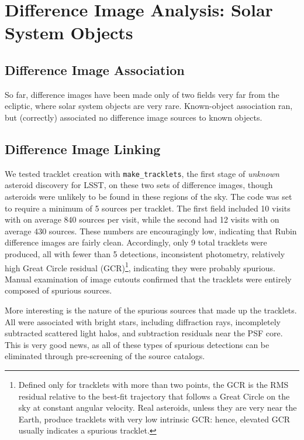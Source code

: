 \section{Difference Image Analysis: Solar System Objects}
\label{sec:dia_solar_system}

\subsection{Difference Image Association}
\label{sec:dia_solar_system_assoc}

So far, difference images have been made only of two fields very far from the ecliptic, where solar system objects are very rare. Known-object association ran, but (correctly) associated no difference image sources to known objects. 

\subsection{Difference Image Linking}
\label{sec:dia_solar_system_link}

We tested tracklet creation with {\tt make\_tracklets}, the first stage of {\em unknown} asteroid discovery for LSST, on these two sets of difference images, though asteroids were unlikely to be found in these regions of the sky. The code was set to require a minimum of 5 sources per tracklet. The first field included 10 visits with on average 840 sources per visit, while the second had 12 visits with on average 430 sources. These numbers are encouragingly low, indicating that Rubin difference images are fairly clean. Accordingly, only 9 total tracklets were produced, all with fewer than 5 detections, inconsistent photometry, relatively high Great Circle residual (GCR)\footnote{Defined only for tracklets with more than two points, the GCR is the RMS residual relative to the best-fit trajectory that follows a Great Circle on the sky at constant angular velocity. Real asteroids, unless they are very near the Earth, produce tracklets with very low intrinsic GCR: hence, elevated GCR usually indicates a spurious tracklet.}, indicating they were probably spurious. Manual examination of image cutouts confirmed that the tracklets were entirely composed of spurious sources. 

More interesting is the nature of the spurious sources that made up the tracklets. All were associated with bright stars, including diffraction rays, incompletely subtracted scattered light halos, and subtraction residuals near the PSF core. This is very good news, as all of these types of spurious detections can be eliminated through pre-screening of the source catalogs. 

